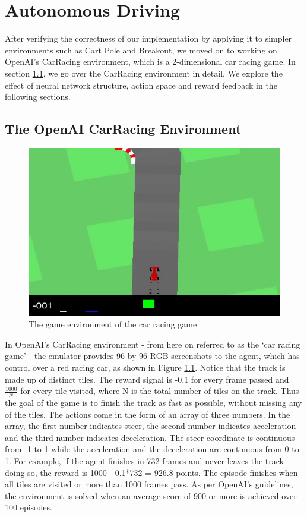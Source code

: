 \chapter{Autonomous Driving}\label{Ch:ResultsCarRacing}

After verifying the correctness of our implementation by applying it to simpler environments such as Cart Pole and Breakout, we moved on to working on OpenAI's CarRacing environment, which is a 2-dimensional car racing game. In section \ref{sec1}, we go over the CarRacing environment in detail. We explore the effect of neural network structure, action space and reward feedback in the following sections.

\section{The OpenAI CarRacing Environment}\label{sec1}
\begin{figure}[h!]
\centering\includegraphics[scale=0.45,clip]{Graphics/carracing.jpg}
\caption[Car Racing]{The game environment of the car racing game}
\label{fig:carracing}
\end{figure}
In OpenAI's CarRacing environment - from here on referred to as the `car racing game' - the emulator provides 96 by 96 RGB screenshots to the agent, which has control over a red racing car, as shown in Figure \ref{fig:carracing}. Notice that the track is made up of distinct tiles. The reward signal is -0.1 for every frame passed and $\frac{1000}{N}$ for every tile visited, where N is the total number of tiles on the track. Thus the goal of the game is to finish the track as fast as possible, without missing any of the tiles. The actions come in the form of an array of three numbers. In the array, the first number indicates steer, the second number indicates acceleration and the third number indicates deceleration. The steer coordinate is continuous from -1 to 1 while the acceleration and the deceleration are continuous from 0 to 1. For example, if the agent finishes in 732 frames and never leaves the track doing so, the reward is 1000 - 0.1*732 = 926.8 points. The episode finishes when all tiles are visited or more than 1000 frames pass. As per OpenAI's guidelines, the environment is solved when an average score of 900 or more is achieved over 100 episodes. 
